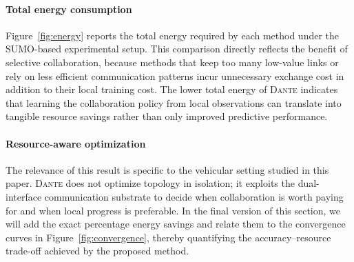 \paragraph{Total energy consumption}
Figure~\ref{fig:energy} reports the total energy required by each method under the SUMO-based experimental setup. This comparison directly reflects the benefit of selective collaboration, because methods that keep too many low-value links or rely on less efficient communication patterns incur unnecessary exchange cost in addition to their local training cost. The lower total energy of \textsc{Dante} indicates that learning the collaboration policy from local observations can translate into tangible resource savings rather than only improved predictive performance.

\paragraph{Resource-aware optimization}
The relevance of this result is specific to the vehicular setting studied in this paper. \textsc{Dante} does not optimize topology in isolation; it exploits the dual-interface communication substrate to decide when collaboration is worth paying for and when local progress is preferable. In the final version of this section, we will add the exact percentage energy savings and relate them to the convergence curves in Figure~\ref{fig:convergence}, thereby quantifying the accuracy--resource trade-off achieved by the proposed method.
